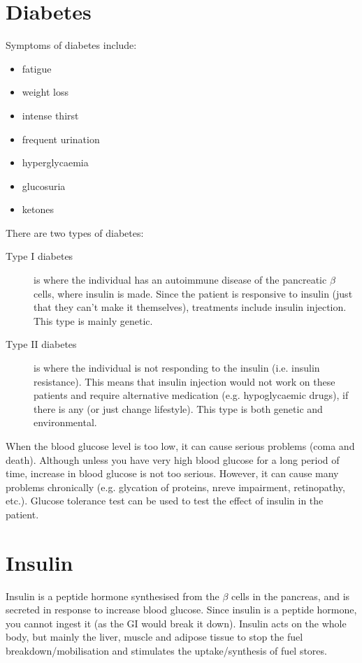 \section{Diabetes}

Symptoms of diabetes include:
\begin{itemize}
\item fatigue
\item weight loss
\item intense thirst
\item frequent urination
\item hyperglycaemia
\item glucosuria
\item ketones
\end{itemize}

There are two types of diabetes:
\begin{description}
\item[Type I diabetes] is where the individual has an autoimmune disease of the pancreatic $\beta$ cells, where insulin is made.
Since the patient is responsive to insulin (just that they can't make it themselves), treatments include insulin injection.
This type is mainly genetic.
\item[Type II diabetes] is where the individual is not responding to the insulin (i.e. insulin resistance).
This means that insulin injection would not work on these patients and require alternative medication (e.g. hypoglycaemic drugs), if there is any (or just change lifestyle).
This type is both genetic and environmental.
\end{description}

When the blood glucose level is too low, it can cause serious problems (coma and death).
Although unless you have very high blood glucose for a long period of time, increase in blood glucose is not too serious.
However, it can cause many problems chronically (e.g. glycation of proteins, nreve impairment, retinopathy, etc.).
Glucose tolerance test can be used to test the effect of insulin in the patient.

\section{Insulin}

Insulin is a peptide hormone synthesised from the $\beta$ cells in the pancreas, and is secreted in response to increase blood glucose.
Since insulin is a peptide hormone, you cannot ingest it (as the GI would break it down).
Insulin acts on the whole body, but mainly the liver, muscle and adipose tissue to stop the fuel breakdown/mobilisation and stimulates the uptake/synthesis of fuel stores.

